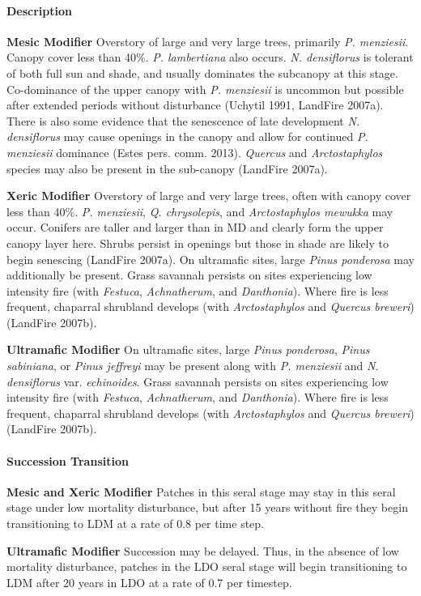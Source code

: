 \paragraph{Description}
\begin{adjustwidth}{2cm}{}
\textbf{Mesic Modifier } Overstory of large and very large trees, primarily \emph{P. menziesii}. Canopy cover less than 40\%. \emph{P. lambertiana} also occurs. \emph{N. densiflorus} is tolerant of both full sun and shade, and usually dominates the subcanopy at this stage. Co-dominance of the upper canopy with \emph{P. menziesii} is uncommon but possible after extended periods without disturbance (Uchytil 1991, LandFire 2007a). There is also some evidence that the senescence of late development \emph{N. densiflorus} may cause openings in the canopy and allow for continued \emph{P. menziesii} dominance (Estes pers. comm. 2013). \emph{Quercus} and \emph{Arctostaphylos} species may also be present in the sub-canopy (LandFire 2007a).

\medskip
\noindent \textbf{Xeric Modifier}  Overstory of large and very large trees, often with canopy cover less than 40\%. \emph{P. menziesii}, \emph{Q. chrysolepis}, and \emph{Arctostaphylos mewukka} may occur. Conifers are taller and larger than in MD and clearly form the upper canopy layer here. Shrubs persist in openings but those in shade are likely to begin senescing (LandFire 2007a). On ultramafic sites, large \emph{Pinus ponderosa} may additionally be present. Grass savannah persists on sites experiencing low intensity fire (with \emph{Festuca}, \emph{Achnatherum}, and \emph{Danthonia}). Where fire is less frequent, chaparral shrubland develops (with \emph{Arctostaphylos} and \emph{Quercus breweri}) (LandFire 2007b).

\medskip
\noindent \textbf{Ultramafic Modifier} On ultramafic sites, large \emph{Pinus ponderosa}, \emph{Pinus sabiniana}, or \emph{Pinus jeffreyi} may be present along with \emph{P. menziesii} and \emph{N. densiflorus} var. \emph{echinoides}. Grass savannah persists on sites experiencing low intensity fire (with \emph{Festuca}, \emph{Achnatherum}, and \emph{Danthonia}). Where fire is less frequent, chaparral shrubland develops (with \emph{Arctostaphylos} and \emph{Quercus breweri}) (LandFire 2007b).

\end{adjustwidth}
\paragraph{Succession Transition}
\begin{adjustwidth}{2cm}{}
\textbf{Mesic and Xeric Modifier } Patches in this seral stage may stay in this seral stage under low mortality disturbance, but after 15 years without fire they begin transitioning to LDM at a rate of 0.8 per time step. 

\medskip
\noindent \textbf{Ultramafic Modifier} Succession may be delayed. Thus, in the absence of low mortality disturbance, patches in the LDO seral stage will begin transitioning to LDM after 20 years in LDO at a rate of 0.7 per timestep. 

\end{adjustwidth}
